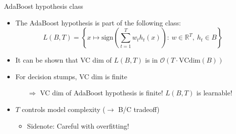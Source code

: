 \begin{frame}{AdaBoost hypothesis class}
    \begin{itemize} \pause
        \item The AdaBoost hypothesis is part of the following class:
        \begin{equation*}
            L(B, T) = \left \{ x \mapsto \text{sign} \left( \sum_{t=1}^T w_t h_t(x) \right): \ 
        w \in \mathbb{R}^T, \  h_t \in B \right \}
        \end{equation*} \pause
        \item It can be shown that VC dim of $L(B, T)$ is in 
            $\mathcal{O}(T \cdot \text{VCdim}(B))$ \pause
        \item For decision stumps, VC dim is finite \pause
        \begin{itemize}
            \item[$\Rightarrow$] VC dim of AdaBoost hypothesis is finite! $L(B, T)$ is learnable!
        \end{itemize} \pause
        \item $T$ controls model complexity ($\rightarrow$ B/C tradeoff)
        \begin{itemize}
            \item Sidenote: Careful with overfitting!
        \end{itemize}
    \end{itemize}
\end{frame}